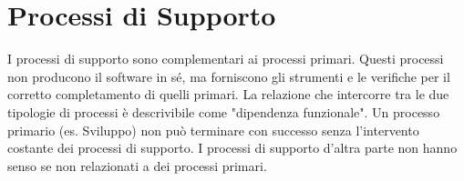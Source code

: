 \documentclass[a4paper,12pt]{article}
\begin{document}

\section{Processi di Supporto} \label{processi_supporto}
I processi di supporto sono complementari ai processi primari.
Questi processi non producono il software in sé, ma forniscono
gli strumenti e le verifiche per il corretto completamento di quelli primari.
La relazione che intercorre tra le due tipologie di processi è descrivibile come "dipendenza funzionale".
Un processo primario (es. Sviluppo) non può terminare con successo senza l'intervento costante dei processi di supporto.
I processi di supporto d'altra parte non hanno senso se non relazionati a dei processi primari.
\end{document}
